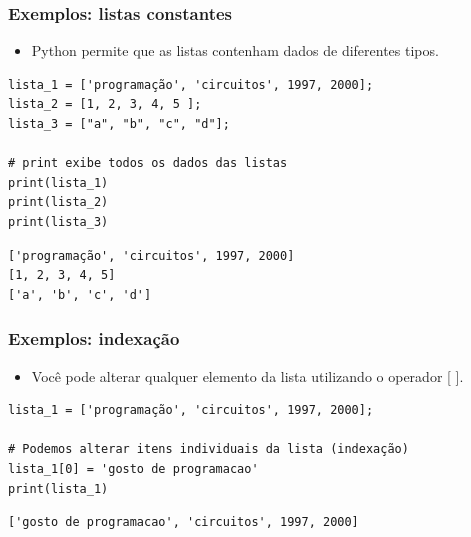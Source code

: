 \documentclass{beamer}
\begin{document}
\begin{frame}[fragile]
    \frametitle{Exemplos: listas constantes}
    
    \begin{itemize}
     \vfill \item Python permite que as listas contenham dados de diferentes tipos.
    \end{itemize}

    \vfill \begin{verbatim}
lista_1 = ['programação', 'circuitos', 1997, 2000];
lista_2 = [1, 2, 3, 4, 5 ];
lista_3 = ["a", "b", "c", "d"];

# print exibe todos os dados das listas
print(lista_1)
print(lista_2)
print(lista_3)
    \end{verbatim}
    
    
    
    \vfill \begin{verbatim}
['programação', 'circuitos', 1997, 2000]
[1, 2, 3, 4, 5]
['a', 'b', 'c', 'd']
    \end{verbatim}
\end{frame}


\begin{frame}[fragile]
\frametitle{Exemplos: indexação}

\begin{itemize}
    \vfill \item Você pode alterar qualquer elemento da lista utilizando o operador [ ].
\end{itemize}

\vfill \begin{verbatim}
lista_1 = ['programação', 'circuitos', 1997, 2000];

# Podemos alterar itens individuais da lista (indexação)
lista_1[0] = 'gosto de programacao'
print(lista_1)

\end{verbatim}

\vfill \begin{verbatim}
['gosto de programacao', 'circuitos', 1997, 2000]
\end{verbatim}

\end{frame}
\end{document}
